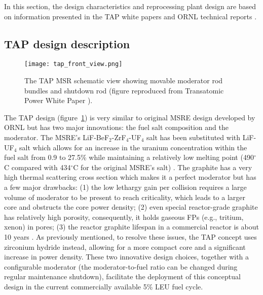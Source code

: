 In this section, the design characteristics and reprocessing plant design are 
based on
information presented in the TAP white papers  
\cite{transatomic_power_corporation_technical_2016, 
transatomic_power_corporation_neutronics_2016} and \gls{ORNL} technical 
reports \cite{betzler_two-dimensional_2017, betzler_assessment_2017}.

\subsection{TAP design description}
\begin{figure}[h] %
	  		\hspace{+2.2in}
	\texttt{[image: tap\_front\_view.png]}
	\caption{The \gls{TAP} \gls{MSR} schematic view showing movable moderator 
		rod 
		bundles and shutdown rod (figure reproduced from Transatomic Power 
		White Paper 
		\cite{transatomic_power_corporation_technical_2016}).}
	\label{fig:tap-main-view}
\end{figure}
The \gls{TAP} design (figure~\ref{fig:tap-main-view}) is very similar to 
original \gls{MSRE} design developed by \gls{ORNL} 
\cite{haubenreich_experience_1970} but has two major innovations: 
the fuel salt composition and the moderator. The \gls{MSRE}'s 
LiF-BeF$_2$-ZrF$_4$-UF$_4$ salt has been substituted with LiF-UF$_4$ salt 
which allows for an increase in the uranium concentration within the fuel salt 
from 0.9 to 27.5\% while maintaining a relatively low melting point 
(490$^{\circ}$C compared with 434$^{\circ}$C for the original \gls{MSRE}'s 
salt) \cite{betzler_two-dimensional_2017}. The graphite has a very high 
thermal scattering cross section which makes it a perfect moderator but has 
a few major drawbacks: 
(1) the low lethargy gain per collision requires a large volume of moderator 
to be present to reach criticality, which leads to a larger core and obstructs 
the core power density; (2) even special 
reactor-grade graphite has relatively high porosity, consequently, it holds
gaseous \glspl{FP} 
(e.g., tritium, xenon) in pores; (3) the reactor graphite lifespan in a 
commercial 
reactor is about 10 years \cite{robertson_conceptual_1971}. As previously 
mentioned, to resolve these issues, the \gls{TAP} concept uses zirconium 
hydride instead, allowing for a more compact core and a significant increase 
in power density. These two innovative design choices, together with a 
configurable moderator (the moderator-to-fuel ratio can be changed during 
regular maintenance shutdown), facilitate the deployment of this conceptual 
design in the current commercially available 5\% \gls{LEU} fuel cycle. 

